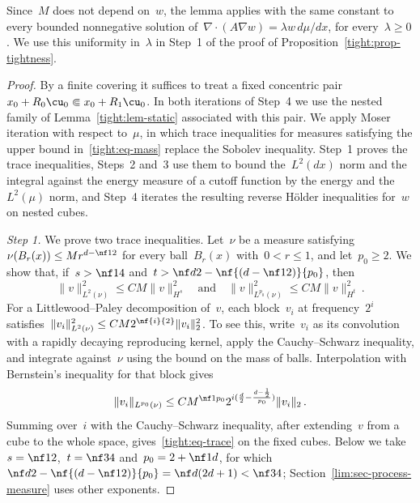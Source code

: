 \documentclass[11pt]{amsart}
\begin{document}
Since~$M$ does not depend on~$w$, the lemma applies with the same constant to every bounded nonnegative solution of~$\nabla\cdot(A\nabla w)=\lambda w\,d\mu/dx$, for every~$\lambda\geq0$. We use this uniformity in~$\lambda$ in Step~1 of the proof of Proposition~\ref{tight:prop-tightness}.

\begin{proof}
By a finite covering it suffices to treat a fixed concentric pair~$x_0+R_0\cu_0\Subset x_0+R_1\cu_0$. In both iterations of Step~4 we use the nested family of Lemma~\ref{tight:lem-static} associated with this pair. We apply Moser iteration with respect to~$\mu$, in which trace inequalities for measures satisfying the upper bound in~\eqref{tight:eq-mass} replace the Sobolev inequality. Step~1 proves the trace inequalities, Steps~2 and~3 use them to bound the~$L^2(dx)$ norm and the integral against the energy measure of a cutoff function by the energy and the~$L^2(\mu)$ norm, and Step~4 iterates the resulting reverse H\"older inequalities for~$w$ on nested cubes.

\smallskip

\emph{Step 1.} We prove two trace inequalities. Let~$\nu$ be a measure satisfying~$\nu(B_r(x))\leq Mr^{d-\nf12}$ for every ball~$B_r(x)$ with~$0<r\leq1$, and let~$p_0\geq2$. We show that, if~$s>\nf14$ and~$t>\nf d2-\nf{(d-\nf12)}{p_0}$, then
\begin{equation}
	\|v\|_{L^2(\nu)}^2\leq CM\|v\|_{H^s}^2
	\quad\text{and}\quad
	\|v\|_{L^{p_0}(\nu)}^2\leq CM\|v\|_{H^t}^2\,.
	\label{tight:eq-trace}
\end{equation}
For a Littlewood--Paley decomposition of~$v$, each block~$v_i$ at frequency~$2^i$ satisfies~$\|v_i\|_{L^2(\nu)}^2\leq CM2^{\nf{i}{2}}\|v_i\|_2^2$. To see this, write~$v_i$ as its convolution with a rapidly decaying reproducing kernel, apply the Cauchy--Schwarz inequality, and integrate against~$\nu$ using the bound on the mass of balls. Interpolation with Bernstein's inequality for that block gives
\begin{equation*}
	\|v_i\|_{L^{p_0}(\nu)}
	\leq CM^{\nf1{p_0}}2^{i(\frac d2-\frac{d-\frac12}{p_0})}\|v_i\|_2\,.
\end{equation*}
Summing over~$i$ with the Cauchy--Schwarz inequality, after extending~$v$ from a cube to the whole space, gives~\eqref{tight:eq-trace} on the fixed cubes. Below we take~$s=\nf12$,~$t=\nf34$ and~$p_0=2+\nf1d$, for which~$\nf d2-\nf{(d-\nf12)}{p_0}=\nf d{(2d+1)}<\nf34$; Section~\ref{lim:sec-process-measure} uses other exponents.


\end{proof}
\end{document}
